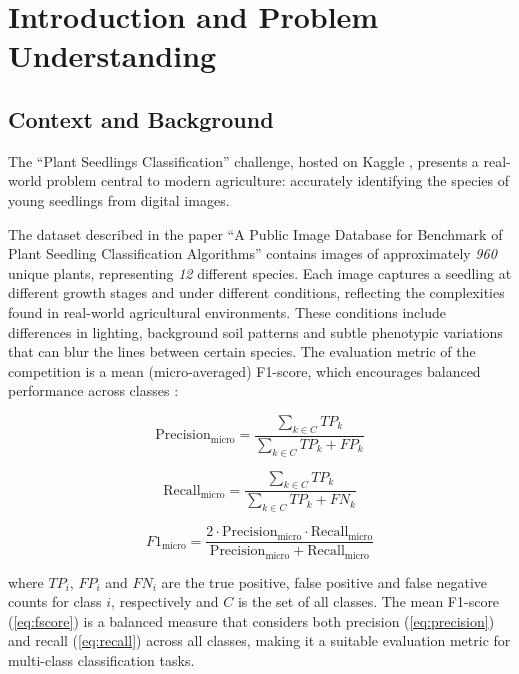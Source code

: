 \section{Introduction and Problem Understanding}

\subsection{Context and Background}
The ``Plant Seedlings Classification'' challenge, hosted on Kaggle \cite{plant-seedlings-classification}, presents a real-world problem central to modern agriculture: accurately identifying the species of young seedlings from digital images.

The dataset described in the paper ``A Public Image Database for Benchmark of Plant Seedling Classification Algorithms'' \cite{DBLP:journals/corr/abs-1711-05458} contains images of approximately \textit{960} unique plants, representing \textit{12} different species. Each image captures a seedling at different growth stages and under different conditions, reflecting the complexities found in real-world agricultural environments. These conditions include differences in lighting, background soil patterns and subtle phenotypic variations that can blur the lines between certain species. The evaluation metric of the competition is a mean (micro-averaged) F1-score, which encourages balanced performance across classes \cite{plant-seedlings-classification-evaluation}:

\begin{equation}
    \text{Precision}_{\text{micro}} = \frac{\sum_{k \in C} TP_k}{\sum_{k \in C} TP_k + FP_k}\label{eq:precision}
\end{equation}

\begin{equation}
    \text{Recall}_{\text{micro}} = \frac{\sum_{k \in C} TP_k}{\sum_{k \in C} TP_k + FN_k}\label{eq:recall}
\end{equation}

\begin{equation}
    F1_{\text{micro}} = \frac{2 \cdot \text{Precision}_{\text{micro}} \cdot \text{Recall}_{\text{micro}}}{\text{Precision}_{\text{micro}} + \text{Recall}_{\text{micro}}}\label{eq:fscore}
\end{equation}

where $TP_i$, $FP_i$ and $FN_i$ are the true positive, false positive and false negative counts for class $i$, respectively and $C$ is the set of all classes. The mean F1-score (\ref{eq:fscore}) is a balanced measure that considers both precision (\ref{eq:precision}) and recall (\ref{eq:recall}) across all classes, making it a suitable evaluation metric for multi-class classification tasks.

